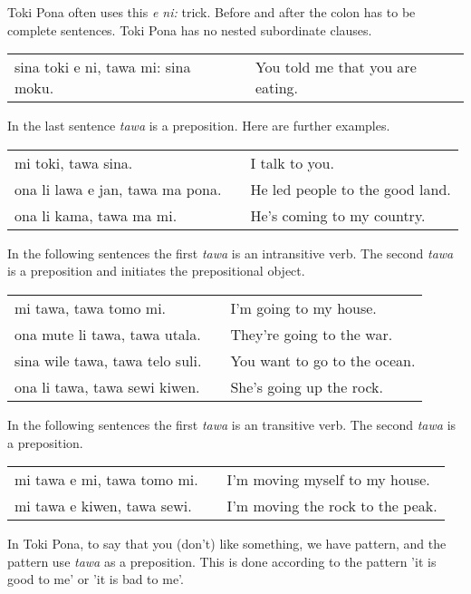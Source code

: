 Toki Pona often uses this \textit{e ni:} trick. 
Before and after the colon has to be complete sentences. 
Toki Pona has no nested subordinate clauses.

\begin{supertabular}{p{5,5cm}|ll}
sina toki e ni, tawa mi: sina moku. && You told me that you are eating. \\
\end{supertabular} 

%
In the last sentence \textit{tawa} is a preposition. 
Here are further examples.

\begin{supertabular}{p{5,5cm}|ll}
mi toki, tawa sina. && I talk to you. \\
ona li lawa e jan, tawa ma pona. && He led people to the good land. \\
ona li kama, tawa ma mi. && He's coming to my country. \\
\end{supertabular} 

In the following sentences the first \textit{tawa} is an intransitive verb.
The second \textit{tawa} is a preposition and initiates the prepositional object. 

\begin{supertabular}{p{5,5cm}|ll}
mi tawa, tawa tomo mi. && I'm going to my house. \\
ona mute li tawa, tawa utala. && They're going to the war. \\
sina wile tawa, tawa telo suli. && You want to go to the ocean. \\
ona li tawa, tawa sewi kiwen. && She's going up the rock. \\
\end{supertabular} 

In the following sentences the first \textit{tawa} is an transitive verb.
The second \textit{tawa} is a preposition.

\begin{supertabular}{p{5,5cm}|ll}
mi tawa e mi, tawa tomo mi. && I'm moving myself to my house. \\
mi tawa e kiwen, tawa sewi. && I'm moving the rock to the peak. \\
\end{supertabular} 

%
In Toki Pona, to say that you (don't) like something, we have pattern, and the pattern use \textit{tawa} as a preposition. 
This is done according to the pattern 'it is good to me' or 'it is bad to me'. 

